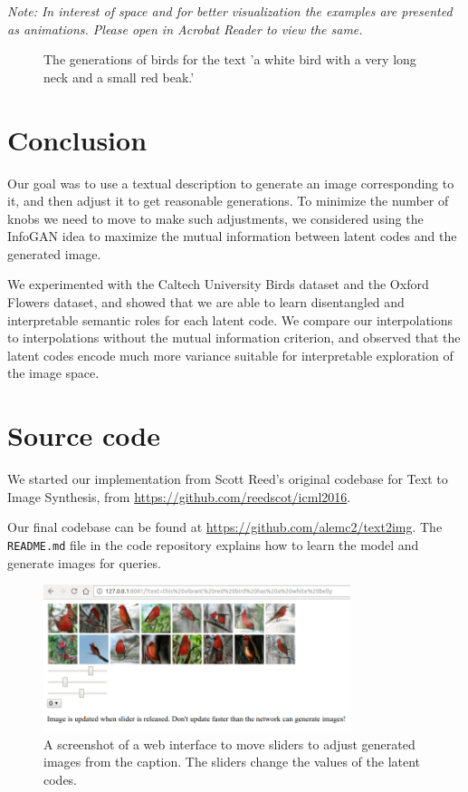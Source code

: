 \documentclass{article}
\begin{document}
\textit{Note: In interest of space and for better visualization the examples are
presented as animations. Please open in Acrobat Reader to view the same.}
\begin{figure}
\caption{The generations of birds for the text 'a white bird with a very long neck and a small red beak.'}
\end{figure}
\section{Conclusion}

Our goal was to use a textual description to generate an image corresponding to it, and then adjust it to get reasonable generations. To minimize the number of knobs we need to move to make such adjustments, we considered using the InfoGAN idea to maximize the mutual information between latent codes and the generated image.

We experimented with the Caltech University Birds dataset and the Oxford Flowers dataset, and showed that we are able to learn disentangled and interpretable semantic roles for each latent code. We compare our interpolations to interpolations without the mutual information criterion, and observed that the latent codes encode much more variance suitable for interpretable exploration of the image space.



\section*{Source code}

We started our implementation from Scott Reed's original codebase for Text to Image Synthesis, from \url{https://github.com/reedscot/icml2016}.

Our final codebase can be found at \url{https://github.com/alemc2/text2img}. The \texttt{README.md} file in the code repository explains how to learn the model and generate images for queries.

\begin{figure}
    \centering
    \includegraphics[width=0.8\textwidth]{web}
    \caption{A screenshot of a web interface to move sliders to adjust generated images from the caption. The sliders change the values of the latent codes.}
    \label{fig:web}
\end{figure}
\end{document}
